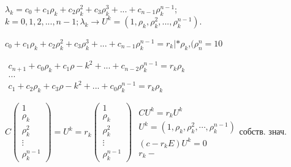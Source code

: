 \documentclass{article}
\begin{document}
\(
\lambda_k = c_0 + c_1\rho_k + c_2\rho_k^2 + c_3\rho_k^3 + ... +c_{n-1}\rho_k^{n-1}
\);\hspace{0.1cm}\(k = 0,1,2,...,n-1; 
\lambda_k \longrightarrow U^k = (1,\rho_k,\rho_k^2,...,\rho_k^{n-1}).\)
\newpage
\begin{center}
\(
 c_0 + c_1\rho_k + c_2\rho_k^2 + c_3\rho_k^3 + ... +c_{n-1}\rho_k^{n-1} = r_k  | *\rho_k
 \),\hspace{0.1cm}\((\rho_n^n = 10\)

\vspace{0.5cm}
\(
\begin{matrix}
	c_{n+1}+ c_0\rho_k + c_1\rho-k^2 + ... + c_{n-2}\rho_k^{n-1} = r_k\rho_k\\
	...\\
	c_1+ c_2\rho_k + c_3\rho-k^2 + ... + c_0\rho_k^{n-1} = r_k\rho_k
\end{matrix}
 \)

\end{center}
\vspace{0.5cm}
\(
C
	\begin{pmatrix}
		1\\ \rho_k \\ \rho_k^2 \\ \vdots \\ \rho_k^{n-1}
	\end{pmatrix}
	=U^k = 
	r_k
	\begin{pmatrix}
		1\\ \rho_k \\ \rho_k^2 \\ \vdots \\ \rho_k^{n-1}
	\end{pmatrix}
\)\hspace{1cm}
\(
	\begin{matrix}
		CU^k = r_kU^k \\
		U^k = (1, \rho_k, \rho_k^2, \cdots, \rho_k^{n-1}) \\
		(c - r_kE)U^k = 0\\ 
		r_k - 
	\end{matrix}
\)собств. знач.
\end{document}
